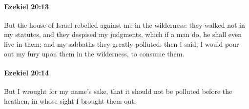 		\paragraph{Ezekiel 20:13} %
			\label{EZEKIEL-20-13}

			But the house of Israel rebelled against me in the wilderness: they walked not in my statutes, and they despised my judgments, which if a man do, he shall even live in them; and my sabbaths they greatly polluted: then I said, I would pour out my fury upon them in the wilderness, to consume them.


		\paragraph{Ezekiel 20:14} %
			\label{EZEKIEL-20-14}

			But I wrought for my name’s sake, that it should not be polluted before the heathen, in whose sight I brought them out.

